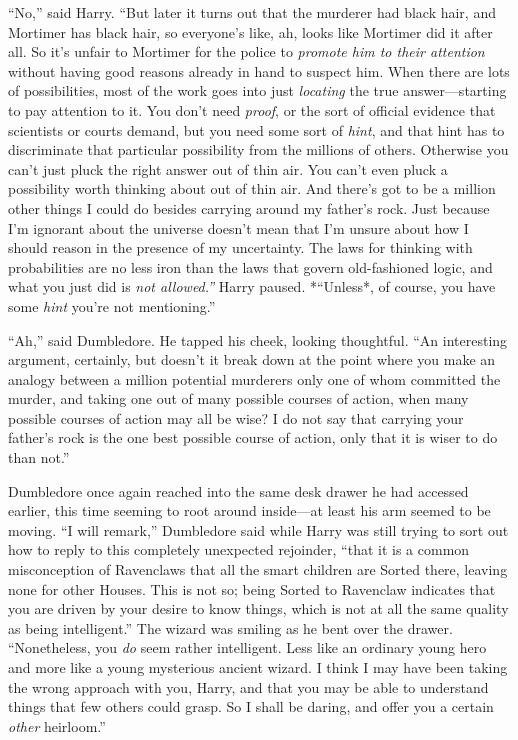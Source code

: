 ``No,'' said Harry. ``But later it turns out that the murderer had black
hair, and Mortimer has black hair, so everyone's like, ah, looks like
Mortimer did it after all. So it's unfair to Mortimer for the police to
\emph{promote him to their attention} without having good reasons
already in hand to suspect him. When there are lots of possibilities,
most of the work goes into just \emph{locating} the true
answer---starting to pay attention to it. You don't need \emph{proof},
or the sort of official evidence that scientists or courts demand, but
you need some sort of \emph{hint}, and that hint has to discriminate
that particular possibility from the millions of others. Otherwise you
can't just pluck the right answer out of thin air. You can't even pluck
a possibility worth thinking about out of thin air. And there's got to
be a million other things I could do besides carrying around my father's
rock. Just because I'm ignorant about the universe doesn't mean that I'm
unsure about how I should reason in the presence of my uncertainty. The
laws for thinking with probabilities are no less iron than the laws that
govern old-fashioned logic, and what you just did is \emph{not
allowed.''} Harry paused. *``Unless*, of course, you have some
\emph{hint} you're not mentioning.''

``Ah,'' said Dumbledore. He tapped his cheek, looking thoughtful. ``An
interesting argument, certainly, but doesn't it break down at the point
where you make an analogy between a million potential murderers only one
of whom committed the murder, and taking one out of many possible
courses of action, when many possible courses of action may all be wise?
I do not say that carrying your father's rock is the one best possible
course of action, only that it is wiser to do than not.''

Dumbledore once again reached into the same desk drawer he had accessed
earlier, this time seeming to root around inside---at least his arm
seemed to be moving. ``I will remark,'' Dumbledore said while Harry was
still trying to sort out how to reply to this completely unexpected
rejoinder, ``that it is a common misconception of Ravenclaws that all
the smart children are Sorted there, leaving none for other Houses. This
is not so; being Sorted to Ravenclaw indicates that you are driven by
your desire to know things, which is not at all the same quality as
being intelligent.'' The wizard was smiling as he bent over the drawer.
``Nonetheless, you \emph{do} seem rather intelligent. Less like an
ordinary young hero and more like a young mysterious ancient wizard. I
think I may have been taking the wrong approach with you, Harry, and
that you may be able to understand things that few others could grasp.
So I shall be daring, and offer you a certain \emph{other} heirloom.''

